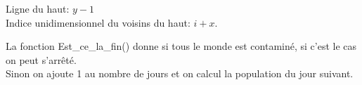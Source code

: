 \begin{enumerate}[label=\textbf{\color{red}\arabic*.}]
{        \item {}
        Ligne du haut: $y-1$\\
        Indice unidimensionnel du voisins du haut: $i+x$.

        \item {}
        La fonction Est\_ce\_la\_fin() donne si tous le monde est contaminé,
        si c'est le cas on peut s'arrêté.\\
        Sinon on ajoute 1 au nombre de jours et on calcul la population du jour suivant.
    }
\end{enumerate}